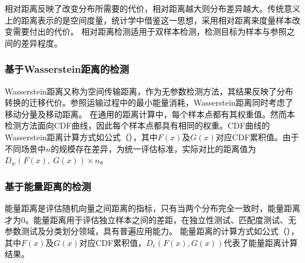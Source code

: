 相对距离反映了改变分布所需要的代价，相对距离越大则分布差异越大。传统意义上的距离表示的是空间度量，统计学中借鉴这一思想，采用相对距离来度量样本改变需要付出的代价。
相对距离检测适用于双样本检测，检测目标为样本与参照之间的差异程度。

\subsubsection{基于Wasserstein距离的检测}
\label{chap:analyze:statistical:distance:wasserstein}

Wasserstein距离又称为空间传输距离，作为无参数检测方法，其结果反映了分布转换的迁移代价。参照运输过程中的最小能量消耗，Wasserstein距离同时考虑了移动分量及移动距离。
在通用的距离计算中，每个样本点都有其权重值。然而本检测方法面向CDF曲线，因此每个样本点都具有相同的权重。CDF曲线的Wasserstein距离计算方式如公式（），其中$F(x)$及$G(x)$对应CDF累积值。由于不同场景中$n$的规模存在差异，为统一评估标准，实际对比的距离值为$D_{w}(F(x),\ G(x))\times n$。

\subsubsection{基于能量距离的检测}
\label{chap:analyze:statistical:distance:energy}

能量距离是评估随机向量之间距离的指标，只有当两个分布完全一致时，能量距离才为0。能量距离用于评估独立样本之间的差距，在独立性测试、匹配度测试、无参数测试及分类划分领域，具有普遍应用能力。
能量距离的计算方式如公式（），其中$F(x)$及$G(x)$对应CDF累积值，$D_{e}(F(x),G(x))$代表了能量距离计算结果。

